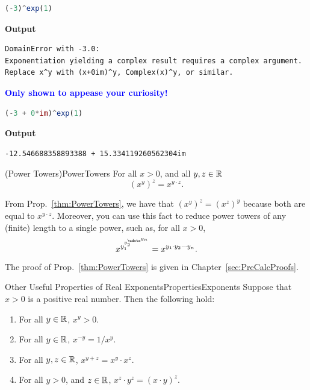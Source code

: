 \begin{lstlisting}[language=Julia,style=mystyle]
(-3)^exp(1)
\end{lstlisting}
\textbf{Output} 
\begin{verbatim}
DomainError with -3.0:
Exponentiation yielding a complex result requires a complex argument.
Replace x^y with (x+0im)^y, Complex(x)^y, or similar.
\end{verbatim}

\textcolor{blue}{\bf Only shown to appease your curiosity!}

\begin{lstlisting}[language=Julia,style=mystyle]
(-3 + 0*im)^exp(1)
\end{lstlisting}
\textbf{Output} 
\begin{verbatim}
-12.546688358893388 + 15.334119260562304im
\end{verbatim}

\Qed



\begin{propColor}{(Power Towers)}{PowerTowers}
 For all $x>0$, and all $y, z \in \mathbb R$
 \begin{equation}
        \left(x^y \right)^z = x^{y \cdot z}. 
    \end{equation}

\end{propColor}

From Prop.~\ref{thm:PowerTowers}, we have that $ \left(x^y \right)^z = \left(x^z \right)^y$ because both are equal to $x^{y \cdot z}$. Moreover, you can use this fact to reduce power towers of any (finite) length to a single power, such as, for all $x>0$,
$$ x^{y_1^{{y_2^{\udots^{y_n}}}}} = x^{y_1 \cdot y_2 \cdots y_n}.$$ The proof of Prop.~\ref{thm:PowerTowers} is given in Chapter~\ref{sec:PreCalcProofs}.


\begin{propColor}{Other Useful Properties of Real Exponents}{PropertiesExponents} 
Suppose that $x>0$ is a positive real number. Then the following hold:
\begin{enumerate}
\renewcommand{\labelenumi}{(\alph{enumi})}
\setlength{\itemsep}{.2cm}
    \item For all $y \in \mathbb R$, $x^y >0$. 
    \item For all $y \in \mathbb R$, $x^{-y} = 1/x^y$.
    \item For all $y, z \in \mathbb R$, $x^{y+z} = x^y \cdot x^z$.
    \item For all $y>0$, and $z \in \mathbb R$, $x^{z} \cdot y^z =  (x \cdot y)^z$.
\end{enumerate}
    
\end{propColor}

